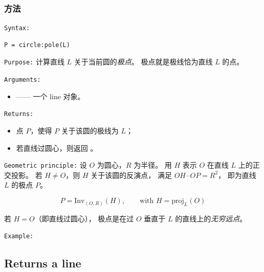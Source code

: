 \subsubsection{方法 }
\label{ssub:method_circle_pole}

\texttt{Syntax:}
\begin{verbatim}
P = circle:pole(L)
\end{verbatim}

\texttt{Purpose:}
计算直线 \(L\) 关于当前圆的\emph{极点}。
极点就是极线恰为直线 \(L\) 的点。

\medskip
\texttt{Arguments:}
\begin{itemize}
  \item {} —— 一个 line 对象。
\end{itemize}

\medskip
\texttt{Returns:}
\begin{itemize}
  \item 点 \(P\)，使得 \(P\) 关于该圆的极线为 \(L\)；
  \item 若直线过圆心，则返回 。
\end{itemize}

\medskip
\texttt{Geometric principle:}
设 \(O\) 为圆心，\(R\) 为半径。
用 \(H\) 表示 \(O\) 在直线 \(L\) 上的正交投影。
若 \(H \neq O\)，则 \(H\) 关于该圆的反演点，
满足 \(OH \cdot OP = R^2\)，
即为直线 \(L\) 的极点 \(P\)。

\[
P = \mathrm{Inv}_{(O,R)}(H),
\qquad \text{with } H = \mathrm{proj}_L(O)
\]

若 \(H = O\)（即直线过圆心），
极点是在过 \(O\) 垂直于 \(L\) 的直线上的\emph{无穷远点}。



\medskip
\texttt{Example:}

\begin{center}
 \end{center}



\subsection{Returns a line}

